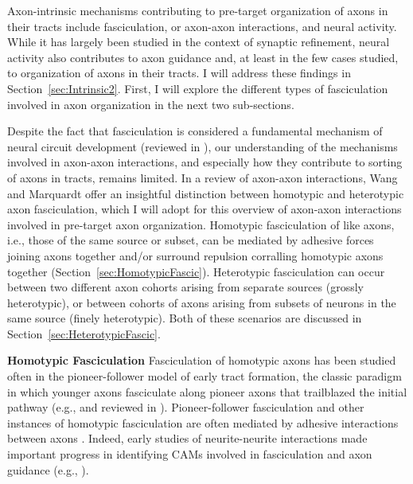 Axon-intrinsic mechanisms contributing to pre-target organization of axons in their tracts include fasciculation, or axon-axon interactions, and neural activity.
While it has largely been studied in the context of synaptic refinement, neural activity also contributes to axon guidance and, at least in the few cases studied, to organization of axons in their tracts.
I will address these findings in Section~\ref{sec:Intrinsic2}.
First, I will explore the different types of fasciculation involved in axon organization in the next two sub-sections.

Despite the fact that fasciculation is considered a fundamental mechanism of neural circuit development (reviewed in ), our understanding of the mechanisms involved in axon-axon interactions, and especially how they contribute to sorting of axons in tracts, remains limited.
In a review of axon-axon interactions, Wang and Marquardt  offer an insightful distinction between homotypic and heterotypic axon fasciculation, which I will adopt for this overview of axon-axon interactions involved in pre-target axon organization. 
Homotypic fasciculation of like axons, i.e., those of the same source or subset, can be mediated by adhesive forces joining axons together and/or surround repulsion corralling homotypic axons together (Section~\ref{sec:HomotypicFascic}).
Heterotypic fasciculation can occur between two different axon cohorts arising from separate sources (grossly heterotypic), or between cohorts of axons arising from subsets of neurons in the same source (finely heterotypic).
Both of these scenarios are discussed in Section~\ref{sec:HeterotypicFascic}.

\label{sec:HomotypicFascic}
\textbf{Homotypic Fasciculation}\newline
Fasciculation of homotypic axons has been studied often in the pioneer-follower model of early tract formation, the classic paradigm in which younger axons fasciculate along pioneer axons that trailblazed the initial pathway (e.g.,  and reviewed in ).
Pioneer-follower fasciculation and other instances of homotypic fasciculation are often mediated by adhesive interactions between axons \cite{van1998adhesion}.
Indeed, early studies of neurite-neurite interactions made important progress in identifying CAMs involved in fasciculation and axon guidance (e.g., ).

